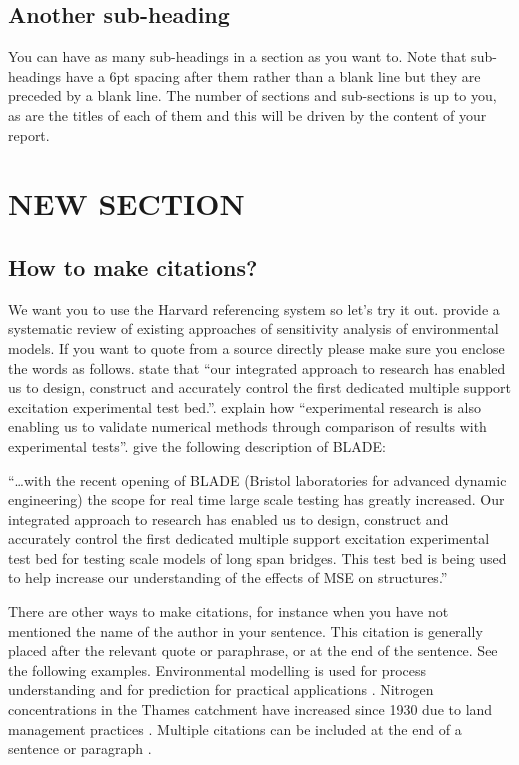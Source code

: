 \documentclass[a4paper,10pt]{article}
\begin{document}
\subsection{Another sub-heading}

You can have as many sub-headings in a section as you want to. Note that sub-headings have a 6pt spacing after them rather than a blank line but they are preceded by a blank line. The number of sections and sub-sections is up to you, as are the titles of each of them and this will be driven by the content of your report.

\section{NEW SECTION}

\subsection{How to make citations?}

We want you to use the Harvard referencing system so let’s try it out. \cite{Witek2020} provide a  systematic review of existing approaches of sensitivity analysis of environmental models. If you want to quote from a source directly please make sure you enclose the words as follows. \cite{norman2006} state that “our integrated approach to research has enabled us to design, construct and accurately control the first dedicated multiple support excitation experimental test bed.”.   \cite{smith2006} explain how “experimental research is also enabling us to validate numerical methods through comparison of results with experimental tests”. \cite{norman2006} give the following description of BLADE: 

“…with the recent opening of BLADE (Bristol laboratories for advanced dynamic engineering) the scope for real time large scale testing has greatly increased. Our integrated approach to research has enabled us to design, construct and accurately control the first dedicated multiple support excitation experimental test bed for testing scale models of long span bridges. This test bed is being used to help increase our understanding of the effects of MSE on structures.”

There are other ways to make citations, for instance when you have not mentioned the name of the author in your sentence. This citation is generally placed after the relevant quote or paraphrase, or at the end of the sentence. See the following examples. Environmental modelling is used for process understanding and for prediction for practical applications \citep{beven2018}.  Nitrogen concentrations in the Thames catchment have increased since 1930 due to land management practices \citep{howden2011}. Multiple citations can be included at the end of a sentence or paragraph \citep{beven2018, howden2011}. 
\end{document}

